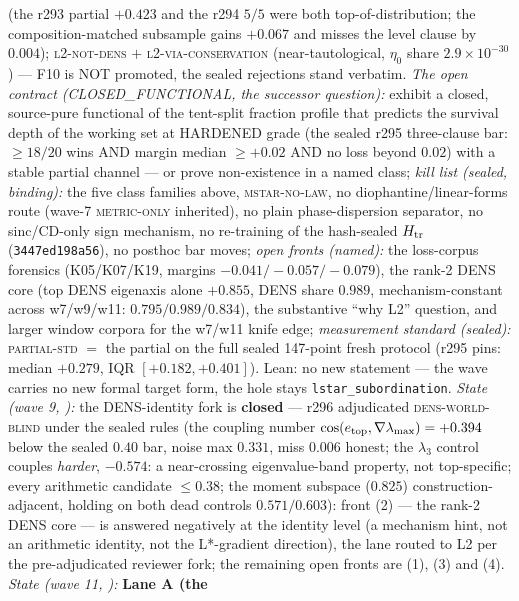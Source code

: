 {(the r293 partial $+0.423$ and the r294 $5/5$ were both
top-of-distribution; the composition-matched subsample gains
$+0.067$ and misses the level clause by $0.004$);
\textsc{l2-not-dens} $+$ \textsc{l2-via-conservation}
(near-tautological, $\eta_0$ share $2.9\times10^{-30}$) --- F10 is
NOT promoted, the sealed rejections stand verbatim.  \emph{The open
contract (CLOSED\_FUNCTIONAL, the successor question):} exhibit a
closed, source-pure functional of the tent-split fraction profile
that predicts the survival depth of the working set at HARDENED
grade (the sealed r295 three-clause bar: $\ge 18/20$ wins AND
margin median $\ge +0.02$ AND no loss beyond $0.02$) with a stable
partial channel --- or prove non-existence in a named class;
\emph{kill list (sealed, binding):} the five class families above,
\textsc{mstar-no-law}, no diophantine/linear-forms route (wave-7
\textsc{metric-only} inherited), no plain phase-dispersion
separator, no sinc/CD-only sign mechanism, no re-training of the
hash-sealed $H_{\rm tr}$ (\texttt{3447ed198a56}), no posthoc bar
moves; \emph{open fronts (named):} the loss-corpus forensics
(K05/K07/K19, margins $-0.041/-0.057/-0.079$), the rank-2 DENS core
(top DENS eigenaxis alone $+0.855$, DENS share $0.989$,
mechanism-constant across w7/w9/w11: $0.795/0.989/0.834$), the
substantive ``why L2'' question, and larger window corpora for the
w7/w11 knife edge; \emph{measurement standard (sealed):}
\textsc{partial-std} $=$ the partial on the full sealed 147-point
fresh protocol (r295 pins: median $+0.279$, IQR $[+0.182,
+0.401]$).  Lean: no new statement --- the wave carries no new
formal target form, the hole stays \texttt{lstar\_subordination}.
\emph{State (wave 9, ):} the
DENS-identity fork is \textbf{closed} --- r296 adjudicated
\textsc{dens-world-blind} under the sealed rules (the coupling
number $\cos(e_{\rm top}, \nabla\lambda_{\max}) = +0.394$ below the
sealed $0.40$ bar, noise max $0.331$, miss $0.006$ honest; the
$\lambda_3$ control couples \emph{harder}, $-0.574$: a
near-crossing eigenvalue-band property, not top-specific; every
arithmetic candidate $\le 0.38$; the moment subspace ($0.825$)
construction-adjacent, holding on both dead controls
$0.571/0.603$): front (2) --- the rank-2 DENS core --- is answered
negatively at the identity level (a mechanism hint, not an
arithmetic identity, not the L*-gradient direction), the lane
routed to L2 per the pre-adjudicated reviewer fork; the remaining
open fronts are (1), (3) and (4).
\emph{State (wave 11,
):} \textbf{Lane A (the
}}
